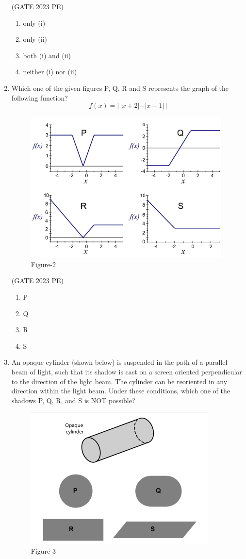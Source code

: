 \documentclass[journal,12pt,onecolumn]{exam}
\theoremstyle{remark}
\begin{document}
\begin{enumerate}
\hfill{(GATE 2023 PE)}\\
\begin{enumerate}
    \item only (i) 
    \item only (ii)
    \item both (i) and (ii)
    \item neither (i) nor (ii)
\end{enumerate}
\item Which one of the given figures P, Q, R and S represents the graph of the following
function?
 \[
 f(x) = |\,|x+2| - |x-1|\,|
 \]
\begin{figure}[H]
    \centering
    \includegraphics[width=0.5\linewidth]{figs/fig2.png}
    \caption{Figure-2}
    \label{fig:figs/fig2.png}
\end{figure}

\hfill{(GATE 2023 PE)}\\
\begin{enumerate}
    \item P
    \item Q
    \item R
    \item S
\end{enumerate}
\item An opaque cylinder (shown below) is suspended in the path of a parallel beam of
light, such that its shadow is cast on a screen oriented perpendicular to the direction
of the light beam. The cylinder can be reoriented in any direction within the light
beam. Under these conditions, which one of the shadows P, Q, R, and S is NOT
possible?
\begin{figure}[H]
    \centering
    \includegraphics[width=0.5\linewidth]{figs/fig3.png}
    \caption{Figure-3}
    \label{fig:figs/fig3.png}
\end{figure}


\end{enumerate}
\end{document}

